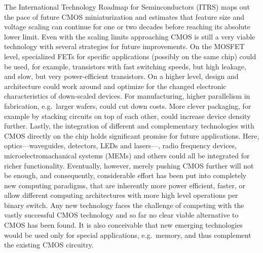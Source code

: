 The International Technology Roadmap for Seminconductors (ITRS) maps out the
pace of future CMOS miniaturization and estimates that feature size and voltage
scaling can continue for one or two decades before reaching its absolute lower
limit. Even with the scaling limits approaching CMOS is still a very viable
technology with several strategies for future improvements. On the MOSFET level,
specialized FETs for specific applications (possibly on the same chip) could be
used, for example, transistors with fast switching speeds, but high leakage, and
slow, but very power-efficient transistors. On a higher level, design and
architecture could work around and optimize for the changed electronic
characteristics of down-scaled devices. For manufacturing, higher parallelism in
fabrication, e.g.~larger wafers, could cut down costs. More clever packaging,
for example by stacking circuits on top of each other, could increase device
density further. Lastly, the integration of different and complementary
technologies with CMOS directly on the chip holds significant promise for future
applications. Here, optics---waveguides, detectors, LEDs and lasers---, radio
frequency devices, microelectromachanical systems (MEMs) and others could all be
integrated for richer functionality. Eventually, however, merely pushing CMOS
further will not be enough, and consequently, considerable effort has been put
into completely new computing paradigms, that are inherently more power
efficient, faster, or allow different computing architectures with more high
level operations per binary switch. Any new technology faces the challenge of
competing with the vastly successful CMOS technology and so far no clear viable
alternative to CMOS has been found. It is also conceivable that new emerging
technologies would be used only for special applications, e.g.~memory, and thus
complement the existing CMOS circuitry.




